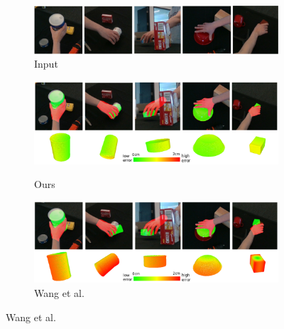 \begin{figure}[!ht]
    \begin{subfigure}{0.98\textwidth}
        \includegraphics[width=\linewidth]{figs/2_rgb}
        \caption{Input}
    \end{subfigure}
    \hfill
    \begin{subfigure}{0.98\textwidth}
        \DIFdelbeginFL %
{%
}
\DIFdelendFL \includegraphics[width=\linewidth]{figs/2_1}
        \caption{Ours}
    \end{subfigure}
    \hfill
    \begin{subfigure}{0.98\textwidth}
        \includegraphics[width=\linewidth]{figs/2_2}
        \caption{Wang et al. \cite{wang2023deep}}
    \end{subfigure}
    \DIFdelbeginFL %

\end{figure}
